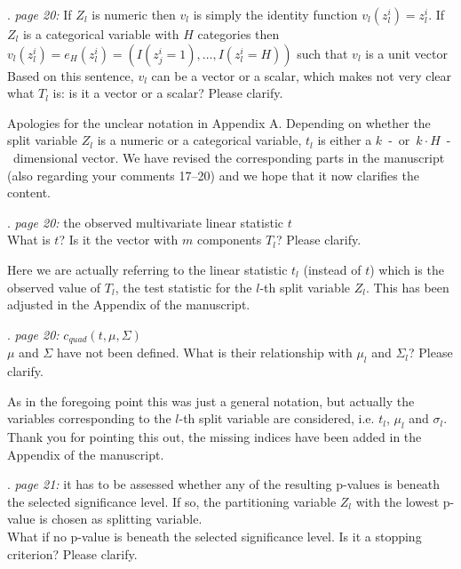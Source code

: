 \documentclass[american,foldmarks=false,noconfig]{uibklttr}
\newenvironment{review}{\fontshape{\itdefault}\fontseries{\bfdefault} \selectfont \smallskip}{\par}
\begin{document}
\begin{review}
16. {\color{quotecolor}\textit{page 20:} If $Z_l$ is numeric 
then $v_l$ is simply the identity function $v_l(z_l^i) = z_l^i$. 
If $Z_l$ is a categorical variable with $H$ categories then 
$v_l(z_l^i) = e_H(z_l^i) = (I(z_j^i = 1), \dots , I(z_l^i = H))$ 
such that $v_l$ is a unit vector}\\
Based on this sentence, $v_l$ can be a vector or a scalar, 
which makes not very clear what $T_l$ is: is it a vector 
or a scalar? Please clarify.
\end{review}

Apologies for the unclear notation in Appendix A.
Depending on whether the split variable $Z_l$ is a numeric 
or a categorical variable, $t_l$ is either a
$k$~-~or~$k \cdot H$~-~dimensional vector.
We have revised the corresponding parts in the manuscript (also 
regarding your comments 17--20) and we hope that it now clarifies 
the content.


\begin{review}
17. {\color{quotecolor}\textit{page 20:} the observed 
multivariate linear statistic $t$}\\
What is $t$? Is it the vector with $m$ components $T_l$? 
Please clarify.
\end{review}

Here we are actually referring to the linear statistic $t_l$ (instead of $t$) 
which is the observed value of $T_l$, the test statistic for the $l$-th split 
variable $Z_l$. This has been adjusted in the Appendix of the manuscript.

\begin{review}
18. {\color{quotecolor}\textit{page 20:} $c_{quad}(t, \mu, \Sigma)$}\\
$\mu$ and $\Sigma$ have not been defined. What is their relationship 
with $\mu_l$ and $\Sigma_l$? Please clarify.
\end{review}

As in the foregoing point this was just a general notation, but 
actually the variables corresponding to the $l$-th split variable 
are considered, i.e. $t_l$, $\mu_l$ and $\sigma_l$. Thank you for
pointing this out, the missing indices have been added in the
Appendix of the manuscript.

\begin{review}
19. {\color{quotecolor}\textit{page 21:} it has to be assessed 
whether any of the resulting p-values is beneath the selected 
significance level. If so, the partitioning variable $Z_l$
with the lowest p-value is chosen as splitting variable.}\\
What if no p-value is beneath the selected significance level. 
Is it a stopping criterion? Please clarify.
\end{review}
\end{document}
